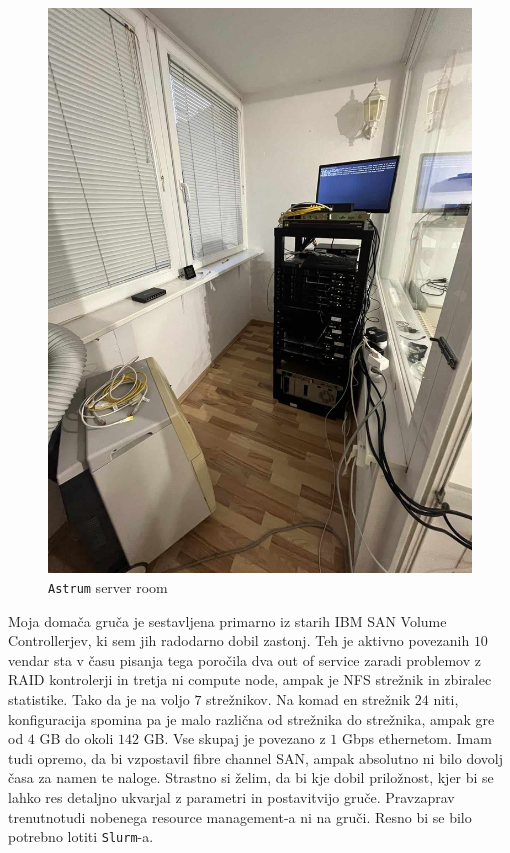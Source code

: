 \documentclass[a4paper]{article}
\begin{document}
\begin{figure}[H]
    \centering
    \includegraphics[height=0.7\textheight]{./astrum-server-room.jpg}
    \caption{\texttt{Astrum} server room}
    \label{fig:astrum}
\end{figure}

Moja domača gruča je sestavljena primarno iz starih IBM SAN Volume Controllerjev, ki sem jih 
radodarno dobil zastonj. Teh je aktivno povezanih $10$ vendar sta v času pisanja tega poročila
dva out of service zaradi problemov z RAID kontrolerji in tretja ni compute node, ampak je 
NFS strežnik in zbiralec statistike. Tako da je na voljo $7$ strežnikov. Na komad en strežnik $24$ 
niti, konfiguracija spomina pa je malo različna od strežnika do strežnika, ampak gre od $4$ GB 
do okoli $142$ GB. Vse skupaj je povezano z $1$ Gbps ethernetom. Imam tudi opremo, da bi vzpostavil
fibre channel SAN, ampak absolutno ni bilo dovolj časa za namen te naloge. Strastno si želim, da 
bi kje dobil priložnost, kjer bi se lahko res detaljno ukvarjal z parametri in postavitvijo gruče. 
Pravzaprav trenutnotudi nobenega resource management-a ni na gruči. Resno bi se bilo potrebno
lotiti \texttt{Slurm}-a. \\
\end{document}

